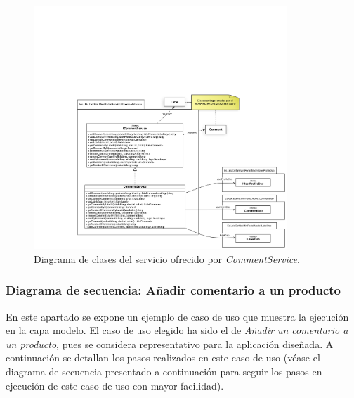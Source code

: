 \documentclass{article}
\begin{document}
\begin{figure}[h]
  \centering
    \includegraphics[width=0.85\textwidth]{img/CommentService.pdf}
  \caption{Diagrama de clases del servicio ofrecido por \emph{CommentService}.}
  \label{fig:CommentService}
\end{figure}		
\clearpage

\subsubsection{Diagrama de secuencia: Añadir comentario a un producto} \label{cap:sec:model}

	En este apartado se expone un ejemplo de caso de uso que muestra la ejecución en la capa modelo. El caso de uso elegido ha sido el de 
	\emph{Añadir un comentario a un producto}, pues se considera representativo para la aplicación diseñada. A continuación se detallan los pasos 
	realizados en este caso de uso (véase el diagrama de secuencia presentado a continuación para seguir los pasos en ejecución de este caso de uso con mayor facilidad).
	
\end{document}
